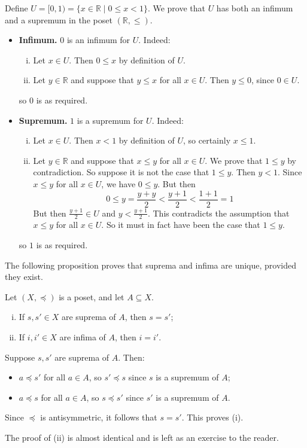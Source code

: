 \begin{example}
Define $U = [0,1) = \{ x \in \mathbb{R} \mid 0 \le x < 1 \}$. We prove that $U$ has both an infimum and a supremum in the poset $(\mathbb{R}, \le)$.
\begin{itemize}
\item \textbf{Infimum.} $0$ is an infimum for $U$. Indeed:
\begin{enumerate}[(i)]
\item Let $x \in U$. Then $0 \le x$ by definition of $U$.
\item Let $y \in \mathbb{R}$ and suppose that $y \le x$ for all $x \in U$. Then $y \le 0$, since $0 \in U$.
\end{enumerate}
so $0$ is as required.
\item \textbf{Supremum.} $1$ is a supremum for $U$. Indeed:
\begin{enumerate}[(i)]
\item Let $x \in U$. Then $x < 1$ by definition of $U$, so certainly $x \le 1$.
\item Let $y \in \mathbb{R}$ and suppose that $x \le y$ for all $x \in U$. We prove that $1 \le y$ by contradiction. So suppose it is not the case that $1 \le y$. Then $y < 1$. Since $x \le y$ for all $x \in U$, we have $0 \le y$. But then
\[ 0 \le y = \frac{y+y}{2} < \frac{y+1}{2} < \frac{1+1}{2} = 1 \]
But then $\frac{y+1}{2} \in U$ and $y < \frac{y+1}{2}$. This contradicts the assumption that $x \le y$ for all $x \in U$. So it must in fact have been the case that $1 \le y$.
\end{enumerate}
so $1$ is as required.
\end{itemize}
\end{example}

The following proposition proves that suprema and infima are unique, provided they exist.
\begin{proposition}
\label{propSupInfUnique}
Let $(X, \preceq)$ is a poset, and let $A \subseteq X$.
\begin{enumerate}[(i)] 
\item If $s,s' \in X$ are suprema of $A$, then $s=s'$;
\item If $i,i' \in X$ are infima of $A$, then $i=i'$.
\end{enumerate}
\end{proposition}
\begin{cproof}
Suppose $s,s'$ are suprema of $A$. Then:
\begin{itemize} 
\item $a \preceq s'$ for all $a \in A$, so $s' \preceq s$ since $s$ is a supremum of $A$;
\item $a \preceq s$ for all $a \in A$, so $s \preceq s'$ since $s'$ is a supremum of $A$.
\end{itemize}
Since $\preceq$ is antisymmetric, it follows that $s=s'$. This proves (i).

The proof of (ii) is almost identical and is left as an exercise to the reader.
\end{cproof}

